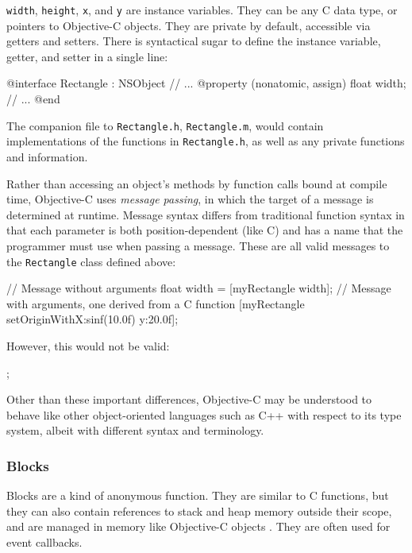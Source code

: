 \texttt{width}, \texttt{height}, \texttt{x}, and \texttt{y} are instance
variables. They can be any C data type, or pointers to Objective-C objects. They
are private by default, accessible via getters and setters. There is syntactical
sugar to define the instance variable, getter, and setter in a single line:

\begin{objc}
@interface Rectangle : NSObject {
    // ...
}
@property (nonatomic, assign) float width;
// ...
@end
\end{objc}

The companion file to \texttt{Rectangle.h}, \texttt{Rectangle.m}, would contain
implementations of the functions in \texttt{Rectangle.h}, as well as any private
functions and information.

Rather than accessing an object's methods by function calls bound at compile
time, Objective-C uses \emph{message passing}, in which the target of a message
is determined at runtime. Message syntax differs from traditional function
syntax in that each parameter is both position-dependent (like C) and has a name
that the programmer must use when passing a message. These are all valid
messages to the \texttt{Rectangle} class defined above:

\begin{objc}
// Message without arguments
float width = [myRectangle width];
// Message with arguments, one derived from a C function
[myRectangle setOriginWithX:sinf(10.0f) y:20.0f];
\end{objc}

However, this would not be valid:

\begin{objc}
;
\end{objc}

Other than these important differences, Objective-C may be understood to behave
like other object-oriented languages such as C++ with respect to its type
system, albeit with different syntax and terminology.

\subsubsection{Blocks}
\label{sect:objc_blocks}

Blocks are a kind of anonymous function. They are similar to C functions, but
they can also contain references to stack and heap memory outside their scope,
and are managed in memory like Objective-C objects \cite{objc:blocks}. They are often used for
event callbacks.

